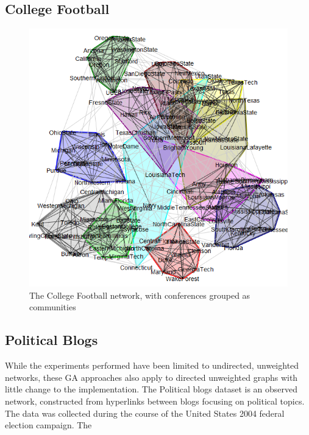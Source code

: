 \subsection{College Football}

\cite{Girvan2002}
\begin{figure}[!htb]
	\begin{center}
		\includegraphics[scale=.5]{images/football.png}
	\end{center}
	\caption{The College Football network, with conferences grouped as communities}
	\label{logo}
\end{figure}


\subsection{Political Blogs}
While the experiments performed have been limited to undirected, unweighted networks, these GA approaches also apply to directed unweighted graphs with little change to the implementation. The Political blogs dataset\cite{Adamic2005} is an observed network, constructed from hyperlinks between blogs focusing on political topics. The data was collected during the course of the United States 2004 federal election campaign. The

